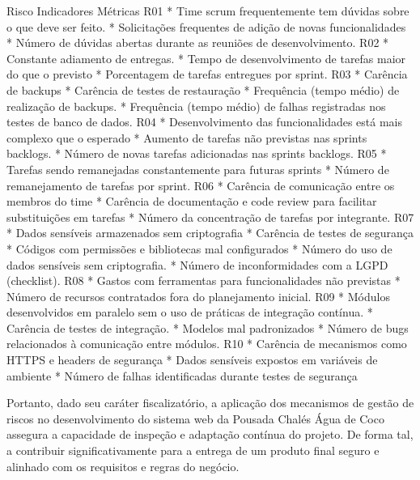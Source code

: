 Risco
	Indicadores
	Métricas
	R01
	* Time scrum frequentemente tem dúvidas sobre o que deve ser feito.
* Solicitações frequentes de adição de novas funcionalidades
	* Número de dúvidas abertas durante as reuniões de desenvolvimento.
	R02
	* Constante adiamento de entregas.
* Tempo de desenvolvimento de tarefas maior do que o previsto
	* Porcentagem de tarefas entregues por sprint.
	R03
	* Carência de backups 
* Carência de testes de restauração
	* Frequência (tempo médio) de realização de backups.
* Frequência (tempo médio) de falhas registradas nos testes de banco de dados.
	R04
	* Desenvolvimento das funcionalidades está mais complexo que o esperado
* Aumento de tarefas não previstas nas sprints backlogs.
	* Número de novas tarefas adicionadas nas sprints backlogs. 
	R05
	* Tarefas sendo remanejadas constantemente para futuras sprints
	* Número de remanejamento de tarefas por sprint.
	R06
	* Carência de comunicação entre os membros do time
* Carência de documentação e code review para facilitar substituições em tarefas
	* Número da concentração de tarefas por integrante.
	R07
	* Dados sensíveis armazenados sem criptografia
* Carência de testes de segurança
* Códigos com permissões e bibliotecas mal configurados
	* Número do uso de dados sensíveis sem criptografia.
* Número de inconformidades com a LGPD (checklist).
	R08
	* Gastos com ferramentas para funcionalidades não previstas 
	* Número de recursos contratados fora do planejamento inicial.
	R09
	* Módulos desenvolvidos em paralelo sem o uso de práticas de integração contínua.
* Carência de testes de integração.
* Modelos mal padronizados
	* Número de bugs relacionados à comunicação entre módulos.
	R10
	* Carência de mecanismos como HTTPS e headers de segurança
* Dados sensíveis expostos em variáveis de ambiente
	* Número de falhas identificadas durante testes de segurança
	

        Portanto, dado seu caráter fiscalizatório, a aplicação dos mecanismos de  gestão de riscos no desenvolvimento do sistema web da Pousada Chalés Água de Coco assegura a capacidade de inspeção e adaptação contínua do projeto. De forma tal, a contribuir significativamente para a entrega de um produto final seguro e alinhado com os requisitos e regras do negócio. 


